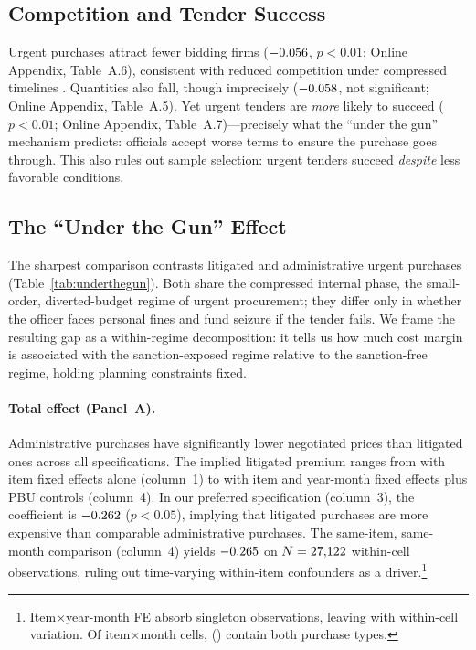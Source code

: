 \subsection{Competition and Tender Success}
\label{sec:competition}

Urgent purchases attract \BPfirmsPctHeadline{} fewer bidding firms ($-0.056$, $p < 0.01$; Online Appendix, Table~A.6), consistent with reduced competition under compressed timelines \citep{bulow1996auctions}. Quantities also fall, though imprecisely ($-0.058$, not significant; Online Appendix, Table~A.5). Yet urgent tenders are \BPsuccessPP{} \emph{more} likely to succeed ($p < 0.01$; Online Appendix, Table~A.7)---precisely what the ``under the gun'' mechanism predicts: officials accept worse terms to ensure the purchase goes through. This also rules out sample selection: urgent tenders succeed \emph{despite} less favorable conditions.

\subsection{The ``Under the Gun'' Effect}
\label{sec:utg}

The sharpest comparison contrasts litigated and administrative urgent purchases (Table~\ref{tab:underthegun}). Both share the compressed internal phase, the small-order, diverted-budget regime of urgent procurement; they differ only in whether the officer faces personal fines and fund seizure if the tender fails. We frame the resulting gap as a within-regime decomposition: it tells us how much cost margin is associated with the sanction-exposed regime relative to the sanction-free regime, holding planning constraints fixed.


\paragraph{Total effect (Panel~A).}
Administrative purchases have significantly lower negotiated prices than litigated ones across all specifications. The implied litigated premium ranges from \BPutgPctItem{} with item fixed effects alone (column~1) to \BPutgPctItemYM{} with item and year-month fixed effects plus PBU controls (column~4). In our preferred specification (column~3), the coefficient is $-0.262$ ($p < 0.05$), implying that litigated purchases are \BPutgPct{} more expensive than comparable administrative purchases. The same-item, same-month comparison (column~4) yields $-0.265$ on $N = 27{,}122$ within-cell observations, ruling out time-varying within-item confounders as a driver.\footnote{Item$\times$year-month FE absorb \BPutgSingletonsItemYM{} singleton observations, leaving \BPutgNobsItemYM{} with within-cell variation. Of \BPutgCellsItemYM{} item$\times$month cells, \BPutgCellsBoth{} (\BPutgCellsBothPct) contain both purchase types.}

